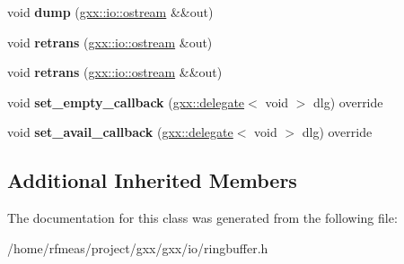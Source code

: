 \begin{DoxyCompactItemize}
\item 
void {\bfseries dump} (\hyperlink{classgxx_1_1io_1_1ostream}{gxx\+::io\+::ostream} \&\&out)\hypertarget{classgxx_1_1io_1_1ringbuffer_a738fb0a9a2bccbe9d55ea0756b6feeaf}{}\label{classgxx_1_1io_1_1ringbuffer_a738fb0a9a2bccbe9d55ea0756b6feeaf}

\item 
void {\bfseries retrans} (\hyperlink{classgxx_1_1io_1_1ostream}{gxx\+::io\+::ostream} \&out)\hypertarget{classgxx_1_1io_1_1ringbuffer_a8890c580b944e29a733b68e19fb47aeb}{}\label{classgxx_1_1io_1_1ringbuffer_a8890c580b944e29a733b68e19fb47aeb}

\item 
void {\bfseries retrans} (\hyperlink{classgxx_1_1io_1_1ostream}{gxx\+::io\+::ostream} \&\&out)\hypertarget{classgxx_1_1io_1_1ringbuffer_a865882a68c6cdcc18e7eb69d67b495ba}{}\label{classgxx_1_1io_1_1ringbuffer_a865882a68c6cdcc18e7eb69d67b495ba}

\item 
void {\bfseries set\+\_\+empty\+\_\+callback} (\hyperlink{classgxx_1_1delegate}{gxx\+::delegate}$<$ void $>$ dlg) override\hypertarget{classgxx_1_1io_1_1ringbuffer_a8429b18d1a51fcd258fd7ffc630f5194}{}\label{classgxx_1_1io_1_1ringbuffer_a8429b18d1a51fcd258fd7ffc630f5194}

\item 
void {\bfseries set\+\_\+avail\+\_\+callback} (\hyperlink{classgxx_1_1delegate}{gxx\+::delegate}$<$ void $>$ dlg) override\hypertarget{classgxx_1_1io_1_1ringbuffer_ada53f514b9b5511d308c61d4a739682a}{}\label{classgxx_1_1io_1_1ringbuffer_ada53f514b9b5511d308c61d4a739682a}

\end{DoxyCompactItemize}
\subsection*{Additional Inherited Members}


The documentation for this class was generated from the following file\+:\begin{DoxyCompactItemize}
\item 
/home/rfmeas/project/gxx/gxx/io/ringbuffer.\+h\end{DoxyCompactItemize}
